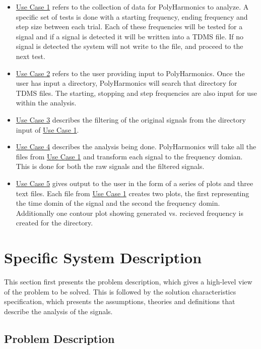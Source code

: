 \documentclass[12pt]{article}
\newcommand{\progname}{PolyHarmonics}
\begin{document}
\begin{itemize}
\item \hyperref[UC_RecordSig]{Use Case 1} refers to the collection of data for
  \progname{} to analyze. A specific set of tests is done with a starting
  frequency, ending frequency and step size between each trial. Each of these
  frequencies will be tested for a signal and if a signal is detected it will  
  be written into a TDMS file. If no signal is detected the system will  
  not write to the file, and proceed to the next test.  
\item \hyperref[UC_InputFile]{Use Case 2}
 refers to the user providing input
 to \progname{}. Once the user has input a directory, 
\progname{} will search that directory for TDMS files. The starting, stopping
and step frequencies are also input for use within the analysis.

\item \hyperref[UC_Filter]{Use Case 3} describes the filtering of the original
  signals from the directory input of \hyperref[UC_InputFile]{Use Case 1}. 

\item \hyperref[UC_AnalyzeInput]{Use Case 4} describes the analysis being
  done. \progname{} will take all the files from \hyperref[UC_InputFile]{Use Case 1} 
  and transform each signal to the frequency domian. This is done for both the raw
  signals and the filtered signals.

\item \hyperref[UC_PlotTrans]{Use Case 5} gives output to the user in the form
  of a series of plots and three text files. Each file from \hyperref[UC_InputFile]{Use Case 1} 
  creates two plots, the first representing the time domin of the signal and the second the frequency domin.           Additionally one contour plot showing generated vs. recieved frequency is created for the directory.
\end{itemize}

\section{Specific System Description}

This section first presents the problem description, which gives a high-level
view of the problem to be solved.  This is followed by the solution
characteristics specification, which presents the assumptions, theories and
definitions that describe the analysis of the signals.

\subsection{Problem Description} \label{Sec_pd}
\end{document}
